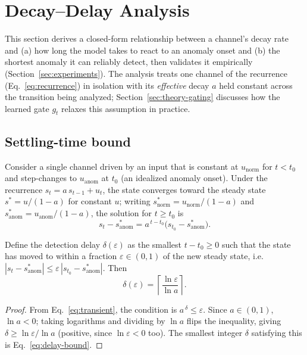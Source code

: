 \section{Decay--Delay Analysis}
\label{sec:theory}

This section derives a closed-form relationship between a channel's decay
rate and (a) how long the model takes to react to an anomaly onset and
(b) the shortest anomaly it can reliably detect, then validates it
empirically (Section~\ref{sec:experiments}). The analysis treats one channel of
the recurrence (Eq.~\ref{eq:recurrence}) in isolation with its
\emph{effective} decay $a$ held constant across the transition being
analyzed; Section~\ref{sec:theory-gating} discusses how the learned gate
$g_t$ relaxes this assumption in practice.

\subsection{Settling-time bound}
\label{sec:theory-settling}
Consider a single channel driven by an input that is constant at
$u_{\text{norm}}$ for $t < t_0$ and step-changes to $u_{\text{anom}}$ at
$t_0$ (an idealized anomaly onset). Under the recurrence
$s_t = a\, s_{t-1} + u_t$, the state converges toward the steady state
$s^\ast = u/(1-a)$ for constant $u$; writing $s_{\text{norm}}^\ast =
u_{\text{norm}}/(1-a)$ and $s_{\text{anom}}^\ast = u_{\text{anom}}/(1-a)$,
the solution for $t \ge t_0$ is
\begin{equation}
  s_t - s_{\text{anom}}^\ast = a^{\,t-t_0}\big(s_{t_0} - s_{\text{anom}}^\ast\big).
  \label{eq:transient}
\end{equation}

\begin{proposition}
\label{prop:settling}
Define the detection delay $\delta(\varepsilon)$ as the smallest
$t - t_0 \ge 0$ such that the state has moved to within a fraction
$\varepsilon \in (0,1)$ of the new steady state, i.e.
$|s_t - s_{\text{anom}}^\ast| \le \varepsilon\, |s_{t_0} -
s_{\text{anom}}^\ast|$. Then
\begin{equation}
  \delta(\varepsilon) = \left\lceil \frac{\ln \varepsilon}{\ln a} \right\rceil.
  \label{eq:delay-bound}
\end{equation}
\end{proposition}
\begin{proof}
From Eq.~\ref{eq:transient}, the condition is $a^{\,\delta} \le
\varepsilon$. Since $a \in (0,1)$, $\ln a < 0$; taking logarithms and
dividing by $\ln a$ flips the inequality, giving $\delta \ge \ln
\varepsilon / \ln a$ (positive, since $\ln\varepsilon < 0$ too). The
smallest integer $\delta$ satisfying this is
Eq.~\ref{eq:delay-bound}.
\end{proof}

